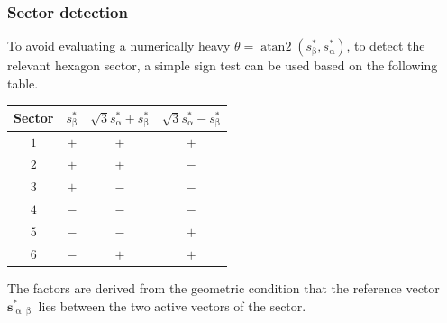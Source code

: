 \begin{frame}
    \frametitle{Sector detection}
    \small
    To avoid evaluating a numerically heavy $\theta = \operatorname{atan2}(s_\upbeta^*, s_\upalpha^*)$, to detect the relevant hexagon sector, a simple sign test can be used based on the following table.
    \begin{table}
        \centering
        \setlength{\tabcolsep}{10pt}
        \renewcommand{\arraystretch}{1.35}
        \begin{tabular}{c c c c}
            \toprule
            Sector & $s_\upbeta^*$ & $\sqrt{3}s_\upalpha^* + s_\upbeta^*$ & $\sqrt{3}s_\upalpha^* - s_\upbeta^*$ \\
            \midrule
            $1$    & $+$           & $+$                                  & $+$                                  \\
            $2$    & $+$           & $+$                                  & $-$                                  \\
            $3$    & $+$           & $-$                                  & $-$                                  \\
            $4$    & $-$           & $-$                                  & $-$                                  \\
            $5$    & $-$           & $-$                                  & $+$                                  \\
            $6$    & $-$           & $+$                                  & $+$                                  \\
            \bottomrule
        \end{tabular}
    \end{table}
    The factors are derived from the geometric condition that the reference vector $\bm{s}_{\upalpha\upbeta}^*$ lies between the two active vectors of the sector.
\end{frame}



